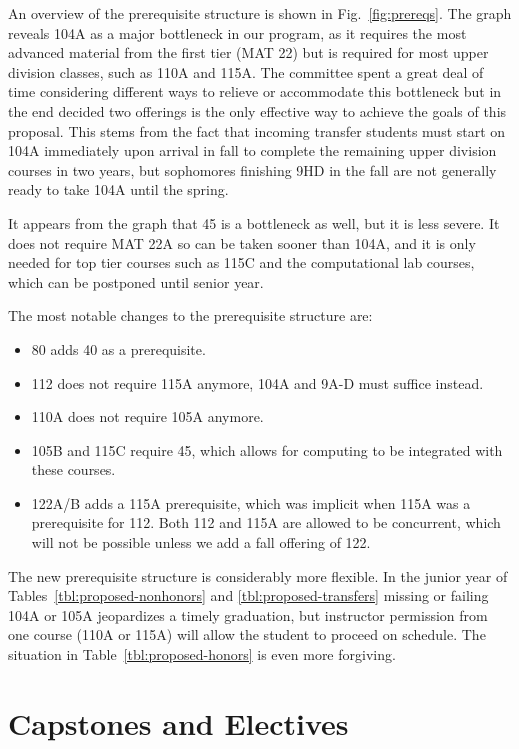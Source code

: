 \documentclass[12pt]{article}
\begin{document}
An overview of the prerequisite structure is shown in Fig.~\ref{fig:prereqs}.  
The graph reveals 104A as a major bottleneck in our program, as it requires the most advanced material from the first tier (MAT 22) but is required for most upper division classes, such as 110A and 115A.  The committee spent a great deal of time considering different ways to relieve or accommodate this bottleneck but in the end decided two offerings is the only effective way to achieve the goals of this proposal.  This stems from the fact that incoming transfer students must start on 104A immediately upon arrival in fall to complete the remaining upper division courses in two years, but sophomores finishing 9HD in the fall are not generally ready to take 104A until the spring.  

It appears from the graph that 45 is a bottleneck as well, but it is less severe.  It does not require MAT 22A so can be taken sooner than 104A, and it is only needed for top tier courses such as 115C and the computational lab courses, which can be postponed until senior year.

The most notable changes to the prerequisite structure are:
\begin{itemize}
\item 80 adds 40 as a prerequisite.
\item 112 does not require 115A anymore, 104A and 9A-D must suffice instead.
\item 110A does not require 105A anymore. 
\item 105B and 115C require 45, which allows for computing to be integrated with these courses. 
\item 122A/B adds a 115A prerequisite, which was implicit when 115A was a prerequisite for 112.  Both 112 and 115A are allowed to be concurrent, which will not be possible unless we add a fall offering of 122.
\end{itemize}
The new prerequisite structure is considerably more flexible.  In the junior year of Tables~\ref{tbl:proposed-nonhonors} and \ref{tbl:proposed-transfers} missing or failing 104A or 105A jeopardizes a timely graduation, but instructor permission from one course (110A or 115A) will allow the student to proceed on schedule.  The situation in Table~\ref{tbl:proposed-honors} is even more forgiving.  

\section{Capstones and Electives}
\end{document}
